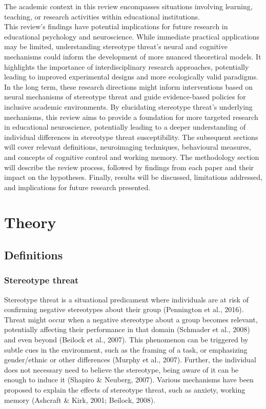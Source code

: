 \documentclass[
  stu, a4paper,floatsintext]{apa7}
\begin{document}
The academic context in this review encompasses situations involving learning, teaching, or research activities within educational institutions.\\
This review's findings have potential implications for future research in educational psychology and neuroscience. While immediate practical applications may be limited, understanding stereotype threat's neural and cognitive mechanisms could inform the development of more nuanced theoretical models. It highlights the importance of interdisciplinary research approaches, potentially leading to improved experimental designs and more ecologically valid paradigms.
In the long term, these research directions might inform interventions based on neural mechanisms of stereotype threat and guide evidence-based policies for inclusive academic environments. By elucidating stereotype threat's underlying mechanisms, this review aims to provide a foundation for more targeted research in educational neuroscience, potentially leading to a deeper understanding of individual differences in stereotype threat susceptibility.
The subsequent sections will cover relevant definitions, neuroimaging techniques, behavioural measures, and concepts of cognitive control and working memory. The methodology section will describe the review process, followed by findings from each paper and their impact on the hypotheses. Finally, results will be discussed, limitations addressed, and implications for future research presented.

\section{Theory}\label{theory}

\subsection{Definitions}\label{definitions}

\subsubsection{Stereotype threat}\label{stereotype-threat}

Stereotype threat is a situational predicament where individuals are at risk of confirming negative stereotypes about their group (Pennington et al., 2016).
Threat might occur when a negative stereotype about a group becomes relevant, potentially affecting their performance in that domain (Schmader et al., 2008) and even beyond (Beilock et al., 2007).
This phenomenon can be triggered by subtle cues in the environment, such as the framing of a task, or emphasizing gender/ethnic or other differences (Murphy et al., 2007).
Further, the individual does not necessary need to believe the stereotype, being aware of it can be enough to induce it (Shapiro \& Neuberg, 2007).
Various mechanisms have been proposed to explain the effects of stereotype threat, such as anxiety, working memory (Ashcraft \& Kirk, 2001; Beilock, 2008).
\end{document}
